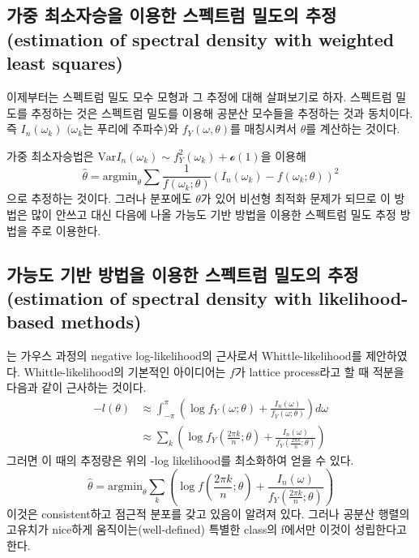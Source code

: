 \documentclass[b5paper,]{scrbook}
\theoremstyle{plain}
\theoremstyle{definition}
\numberwithin{equation}{section}
\begin{document}
\hypertarget{-----estimation-of-spectral-density-with-weighted-least-squares}{%
\subsection{가중 최소자승을 이용한 스펙트럼 밀도의 추정(estimation of spectral density with weighted least squares)}\label{-----estimation-of-spectral-density-with-weighted-least-squares}}

이제부터는 스펙트럼 밀도 모수 모형과 그 추정에 대해 살펴보기로 하자. 스펙트럼 밀도를 추정하는 것은 스펙트럼 밀도를 이용해 공분산 모수들을 추정하는 것과 동치이다. 즉 \(I_{n}(\omega_{k})\) \((\omega_{k}\)는 푸리에 주파수)와 \(f_{Y}(\omega, \theta)\)를 매칭시켜서 \(\theta\)를 계산하는 것이다.

가중 최소자승법은 \(\text{Var}I_{n}(\omega_{k})\sim f_{Y}^{2}(\omega_{k})+\mathcal{o}(1)\)을 이용해
\[\hat{\theta}=\text{argmin}_{\theta}\sum\frac{1}{f(\omega_{k};\theta)}(I_{n}(\omega_{k})-f(\omega_{k};\theta))^{2}\]
으로 추정하는 것이다. 그러나 분포에도 \(\theta\)가 있어 비선형 최적화 문제가 되므로 이 방법은 많이 안쓰고 대신 다음에 나올 가능도 기반 방법을 이용한 스펙트럼 밀도 추정 방법을 주로 이용한다.

\hypertarget{------estimation-of-spectral-density-with-likelihood-based-methods}{%
\subsection{가능도 기반 방법을 이용한 스펙트럼 밀도의 추정(estimation of spectral density with likelihood-based methods)}\label{------estimation-of-spectral-density-with-likelihood-based-methods}}

\citep{Whittle1954}는 가우스 과정의 negative log-likelihood의 근사로서 Whittle-likelihood를 제안하였다. Whittle-likelihood의 기본적인 아이디어는 \(f\)가 lattice process라고 할 때 적분을 다음과 같이 근사하는 것이다.
\begin{align*} 
-l(\theta) &\approx \int_{-\pi}^{\pi}(\log f_{Y}(\omega; \theta) + \frac{I_{n}(\omega)}{f_{Y}(\omega;\theta)})d\omega \\ 
 &\approx \sum_{k}(\log f_{Y}(\frac{2\pi k}{n};\theta) + \frac{I_{n}(\omega)}{f_{Y}(\frac{2\pi k}{n};\theta)})
\end{align*}
그러면 이 때의 추정량은 위의 -log likelihood를 최소화하여 얻을 수 있다.
\[\hat{\theta}=\text{argmin}_{\theta}\sum_{k}(\log f(\frac{2\pi k}{n};\theta)+ \frac{I_{n}(\omega)}{f_{Y}(\frac{2\pi k}{n};\theta)})\]
이것은 consistent하고 점근적 분포를 갖고 있음이 알려져 있다. 그러나 공분산 행렬의 고유치가 nice하게 움직이는(well-defined) 특별한 class의 f에서만 이것이 성립한다고 한다.
\end{document}

